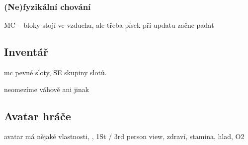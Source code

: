 \subsubsection{(Ne)fyzikální chování}

MC -- bloky stojí ve vzduchu, ale třeba písek při updatu začne padat

\subsection{Inventář}

mc pevné sloty, SE skupiny slotů.

neomezíme váhově ani jinak 

\subsection{Avatar hráče}
avatar má nějaké vlastnosti, \HUD{}, 1St / 3rd person view, zdraví, stamina, hlad, O2



